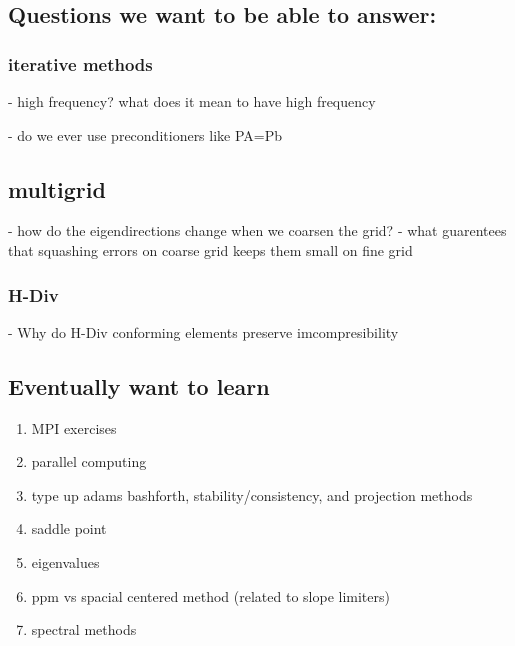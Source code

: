 \documentclass[12pt,a4paper,twoside]{article}
\begin{document}
\subsection*{Questions we want to be able to answer:}
\subsubsection*{iterative methods}
- high frequency? what does it mean to have high frequency

- do we ever use preconditioners like PA=Pb
\subsection*{multigrid}
- how do the eigendirections change when we coarsen the grid?
- what guarentees that squashing errors on coarse grid keeps them small on fine grid 

\subsubsection*{H-Div}
- Why do H-Div conforming elements preserve imcompresibility 


\subsection*{Eventually want to learn}

\begin{enumerate}
\item MPI exercises %
\item parallel computing
\item type up adams bashforth, stability/consistency, and projection methods
\item saddle point
\item eigenvalues
\item ppm vs spacial centered method (related to slope limiters)
\item spectral methods
\end{enumerate}
\end{document}
